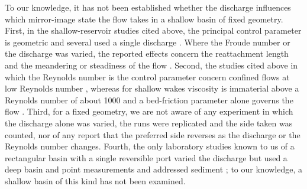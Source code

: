 \begin{en}[I-5]
To our knowledge, it has not been established whether the discharge influences which mirror-image state the flow takes in a shallow basin of fixed geometry. First, in the shallow-reservoir studies cited above, the principal control parameter is geometric and several used a single discharge \citep{dewalsExperimentalNumericalAnalysis2008,camnasioExperimentalStudyVelocity2011,kantoushFlowFieldInvestigation2008}. Where the Froude number or the discharge was varied, the reported effects concern the reattachment length and the meandering or steadiness of the flow \citep{dufresneClassificationFlowPatterns2010,peltierExperimentalInvestigationMeandering2014,chagdaliFlowPatternsShallow2025}. Second, the studies cited above in which the Reynolds number is the control parameter concern confined flows at low Reynolds number \citep{cherdronAsymmetricFlowsInstabilities1978,fearnNonlinearFlowPhenomena1990}\unverified{} \citep{mullinFlowSymmetricChannel2003}, whereas for shallow wakes viscosity is immaterial above a Reynolds number of about 1000  and a bed-friction parameter alone governs the flow \citep{chenAbsoluteConvectiveInstabilities1997}. Third, for a fixed geometry, we are not aware of any experiment in which the discharge alone was varied, the runs were replicated and the side taken was counted, nor of any report that the preferred side reverses as the discharge or the Reynolds number changes. Fourth, the only laboratory studies known to us of a rectangular basin with a single reversible port varied the discharge but used a deep basin and point measurements and addressed sediment \citep{mullerInfluenceOutflowSequences2012,mullerExperimentsEffectInflow2017}; to our knowledge, a shallow basin of this kind has not been examined.
\end{en}
